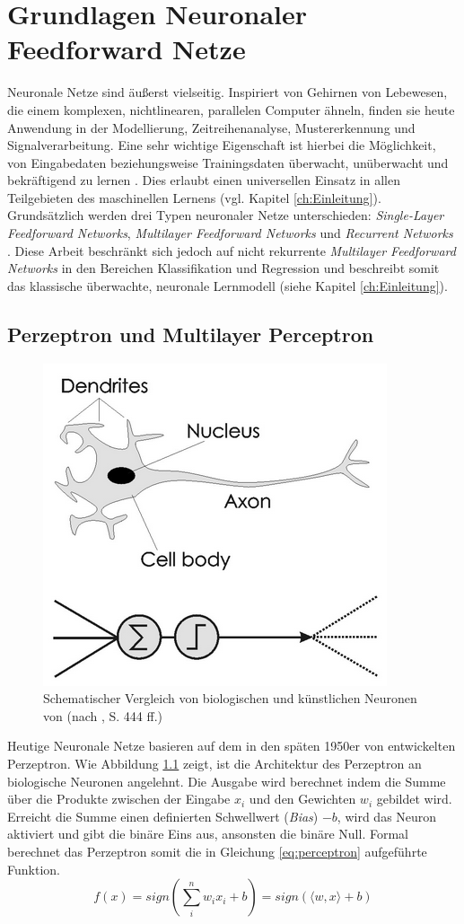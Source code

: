 \chapter{Grundlagen Neuronaler Feedforward Netze}
\label{ch:mlp}
Neuronale Netze sind äußerst vielseitig. Inspiriert von Gehirnen von Lebewesen, die  einem komplexen, nichtlinearen, parallelen Computer ähneln, finden sie heute Anwendung in der Modellierung, Zeitreihenanalyse, Mustererkennung und Signalverarbeitung. Eine sehr wichtige Eigenschaft ist hierbei die Möglichkeit, von Eingabedaten beziehungsweise Trainingsdaten überwacht, unüberwacht und bekräftigend zu lernen \cite[vgl.][S. 1]{Haykin1999}. Dies erlaubt einen universellen Einsatz in allen Teilgebieten des maschinellen Lernens (vgl. Kapitel \ref{ch:Einleitung}).
Grundsätzlich werden drei Typen neuronaler Netze unterschieden: \textit{Single-Layer Feedforward Networks}, \textit{Multilayer Feedforward Networks} und \textit{Recurrent Networks} \cite[vgl.][S. 22f]{Haykin1999}. Diese Arbeit beschränkt sich jedoch auf nicht rekurrente \textit{Multilayer Feedforward Networks} in den Bereichen Klassifikation und Regression und beschreibt somit das klassische überwachte, neuronale Lernmodell (siehe Kapitel \ref{ch:Einleitung}).


\section{Perzeptron und Multilayer Perceptron}
\begin{figure}
\centering
\includegraphics[width=0.4\linewidth]{images/2_neuron}
\caption[Schematischer Vergleich von biologischen und künstlichen \cite{McCulloch1943} Neuronen ]{Schematischer Vergleich von biologischen und künstlichen Neuronen von \cite{McCulloch1943} (nach \cite{Winston1992}, S. 444 ff.)}
\label{fig:2_Neuron}
\end{figure}
Heutige Neuronale Netze basieren auf dem in den späten 1950er von \cite{Rosenblatt1962} entwickelten Perzeptron. Wie Abbildung \ref{fig:2_Neuron} zeigt, ist die Architektur des Perzeptron an biologische Neuronen angelehnt. Die Ausgabe wird berechnet indem die Summe über die Produkte zwischen der Eingabe $x_i$ und den Gewichten $w_i$ gebildet wird. Erreicht die Summe einen definierten Schwellwert (\textit{Bias}) $-b$, wird das Neuron aktiviert und gibt die binäre Eins aus, ansonsten die binäre Null. Formal berechnet das Perzeptron somit die in Gleichung \ref{eq:perceptron} aufgeführte Funktion.
\begin{equation}
\label{eq:perceptron}
f(x) = sign(\sum_{i}^{n} w_ix_i + b) = sign(\langle w, x \rangle + b) 
\end{equation}

